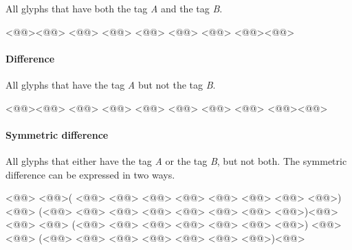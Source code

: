 
All glyphs that have both the tag \emph{A} and the tag \emph{B}.

\begin{RichListing}
<@\Token{\$[}@><@@> <@@> <@@> <@@> <@@> <@@> <@@><@\Token{]}@>
\end{RichListing}

\vspace{-1em}\paragraph{Difference}%
\label{par:difference}


All glyphs that have the tag \emph{A} but not the tag \emph{B}.

\begin{RichListing}
<@\Token{\$[}@><@@> <@@> <@@> <@@> <@@> <@@> <@@> <@@><@\Token{]}@>
\end{RichListing}

\vspace{-1em}\paragraph{Symmetric difference}%
\label{par:symmetric_difference}

All glyphs that either have the tag \emph{A} or the tag \emph{B}, but not both.
The symmetric difference can be expressed in two ways.


\begin{RichListing}
<@@>
<@\Token{\$[}@>(    <@@> <@@> <@@> <@@> <@@> <@@> <@@> <@@>) <@@>
  (<@@> <@@> <@@> <@@> <@@>     <@@> <@@> <@@>)<@\Token{]}@>
<@@>
<@\Token{\$[}@>    (<@@> <@@> <@@> <@@>  <@@> <@@> <@@>) <@@>
  <@@> (<@@> <@@> <@@> <@@> <@@> <@@> <@@>)<@\Token{]}@>
\end{RichListing}

